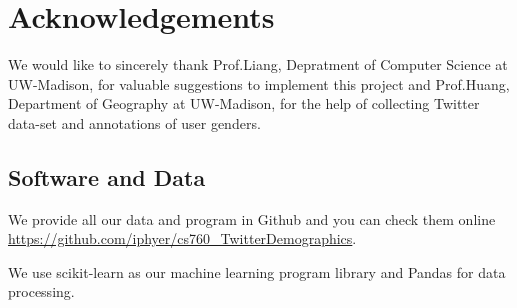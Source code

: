 \documentclass{article}
\begin{document}
\section*{Acknowledgements} 

We would like to sincerely thank Prof.Liang, Depratment of Computer Science at UW-Madison, for valuable suggestions to implement this project and Prof.Huang, Department of Geography at UW-Madison, for the help of collecting Twitter data-set and annotations of user genders.

\subsection*{Software and Data}

We provide all our data and program in Github and you can check them online \url{https://github.com/iphyer/cs760_TwitterDemographics}.

We use scikit-learn \cite{scikit-learn} as our machine learning program library and Pandas \cite{mckinney2015pandas} for data processing.




\end{document}
